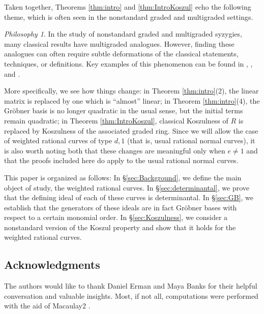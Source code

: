 \documentclass[12pt,reqno]{amsart}
\theoremstyle{definition}
\theoremstyle{remark}
\newtheorem{philosophy}[theorem]{Philosophy}
\begin{document}
Taken together, Theorems \ref{thm:intro} and \ref{thm:IntroKoszul} echo the following theme, which is often seen in the nonstandard graded and multigraded settings.

\begin{philosophy}\label{phil:multigradedSyz}
In the study of nonstandard graded and multigraded syzygies, many classical results have multigraded analogues.   However, finding these analogues can often require subtle deformations of the classical statements, techniques, or definitions. Key examples of this phenomenon can be found in \cite{besVirtualRes}, \cite{msMultigradedCMReg}, and \cite{beTateRes}.
\end{philosophy}

More specifically, we see how things change: in Theorem \ref{thm:intro}(2), the linear matrix is replaced by one which is ``almost'' linear; in Theorem \ref{thm:intro}(4), the Gr\"obner basis is no longer quadratic in the usual sense, but the initial terms remain quadratic; in Theorem \ref{thm:IntroKoszul}, classical Koszulness of $R$ is replaced by Koszulness of the associated graded ring.  Since we will allow the case of weighted rational curves of type $d,1$ (that is, usual rational normal curves), it is also worth noting both that these changes are meaningful only when $e\neq 1$ and that the proofs included here do apply to the usual rational normal curves.

This paper is organized as follows: In \S \ref{sec:Background}, we define the main object of study, the weighted rational curves.  In \S \ref{sec:determinantal}, we prove that the defining ideal of each of these curves is determinantal.  In \S \ref{sec:GB}, we establish that the generators of these ideals are in fact Gr\"obner bases with respect to a certain monomial order.  In \S \ref{sec:Koszulness}, we consider a nonstandard version of the Koszul property and show that it holds for the weighted rational curves.


\subsection*{Acknowledgments} The authors would like to thank Daniel Erman and Maya Banks for their helpful conversation and valuable insights. Most, if not all, computations were performed with the aid of Macaulay2 \cite{M2}.






 
\end{document}

